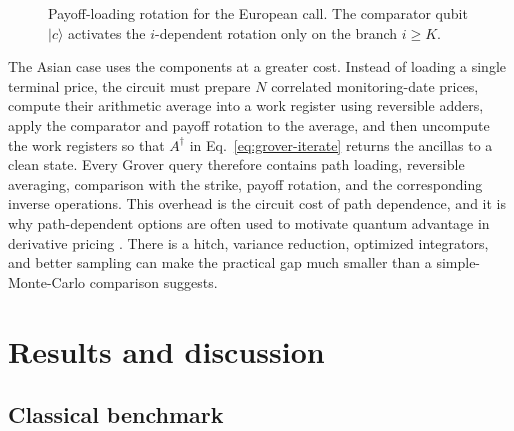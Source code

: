\documentclass[12pt]{article}
\begin{document}
\begin{figure}[H]
    \centering
    \caption{Payoff-loading rotation for the European call.  The comparator qubit $\lvert c\rangle$ activates the $i$-dependent rotation only on the branch $i\ge K$.}
    \label{fig:payoff-rotation-circuit}
\end{figure}

The Asian case uses the components at a greater cost.  Instead of loading a single terminal price, the circuit must prepare $N$ correlated monitoring-date prices, compute their arithmetic average into a work register using reversible adders, apply the comparator and payoff rotation to the average, and then uncompute the work registers so that $A^\dagger$ in Eq.~\eqref{eq:grover-iterate} returns the ancillas to a clean state.  Every Grover query therefore contains path loading, reversible averaging, comparison with the strike, payoff rotation, and the corresponding inverse operations.  This overhead is the circuit cost of path dependence, and it is why path-dependent options are often used to motivate quantum advantage in derivative pricing \cite{stamatopoulosOptionPricingUsing2020,wangOptionPricingStochastic2024}. There is a hitch, variance reduction, optimized integrators, and better sampling can make the practical gap much smaller than a simple-Monte-Carlo comparison suggests.

\section{Results and discussion}

\subsection{Classical benchmark}
\end{document}
